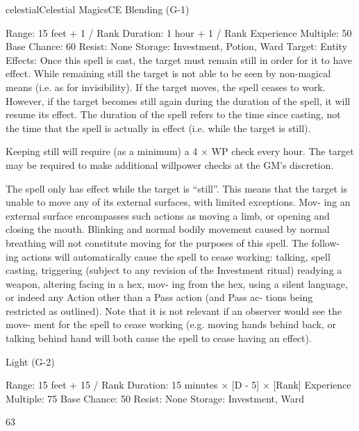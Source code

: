 \begin{College}[1.3]{celestial}{Celestial Magics}{CE}
Blending (G-1) 

Range: 15 feet + 1 / Rank 
Duration: 1 hour + 1 / Rank 
Experience Multiple: 50 
Base Chance: 60%
Resist: None 
Storage: Investment, Potion, Ward 
Target: Entity 
Effects:  Once  this  spell  is  cast,  the  target  must 
remain  still  in  order  for  it  to  have  effect.  While 
remaining  still  the  target  is  not  able  to  be  seen  by 
non-magical  means  (i.e.  as  for  invisibility).  If  the 
target moves, the spell ceases to work. However, if 
the target becomes still again during the duration of 
the  spell,  it  will  resume  its  effect.  The  duration  of 
the  spell  refers  to  the  time  since  casting,  not  the 
time  that  the  spell  is  actually  in  effect  (i.e.  while 
the target is still). 

Keeping still will require (as a minimum) a 4 × WP 
check  every  hour.  The  target  may  be  required  to 
make  additional  willpower  checks  at  the  GM’s 
discretion. 

The spell only has effect while the target is “still”. 
This means that the target is unable to move any of 
its external surfaces, with limited exceptions. Mov-
ing  an  external  surface  encompasses  such  actions 
as  moving  a  limb,  or  opening  and  closing  the 
mouth.  Blinking  and  normal  bodily  movement 
caused  by  normal  breathing  will  not  constitute 
moving  for  the  purposes  of  this  spell.  The  follow-
ing  actions  will  automatically  cause  the  spell  to 
cease  working:  talking,  spell  casting,  triggering 
(subject  to  any  revision  of  the  Investment  ritual) 
readying  a  weapon,  altering  facing  in  a  hex,  mov-
ing from the hex, using a silent language, or indeed 
any  Action  other  than  a  Pass  action  (and  Pass  ac-
tions  being  restricted  as  outlined).  Note  that  it  is 
not  relevant  if  an  observer  would  see  the  move-
ment  for  the  spell  to  cease  working  (e.g.  moving 
hands  behind  back,  or  talking  behind  hand  will 
both cause the spell to cease having an effect). 

Light (G-2) 

Range: 15 feet + 15 / Rank 
Duration: 15 minutes × [D - 5] × [Rank] 
Experience Multiple: 75 
Base Chance: 50%
Resist: None 
Storage: Investment, Ward 

63 


\end{College}
